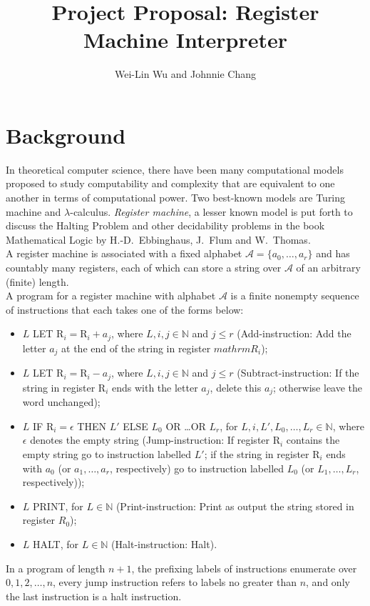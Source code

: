 \documentclass[english]{article}
\begin{document}
\title{Project Proposal: Register Machine Interpreter}

\author{Wei-Lin Wu and Johnnie Chang}

\maketitle
\thispagestyle{fancy}


\section{Background}
In theoretical computer science, there have been many computational models proposed 
to study computability and complexity that are equivalent to one another in terms of computational power. 
Two best-known models are Turing machine and $\lambda$-calculus. 
\emph{Register machine}, a lesser known model is put forth to discuss the Halting Problem 
and other decidability problems in the book Mathematical Logic by H.-D.\ Ebbinghaus, J.\ Flum and W.\ Thomas.
\medskip\\
A register machine is associated with a fixed alphabet $\mathcal{A} = \{a_0, \ldots, a_r\}$ and has countably many registers, 
each of which can store a string over $\mathcal{A}$ of an arbitrary (finite) length.
\medskip\\
A program for a register machine with alphabet $\mathcal{A}$ is a finite nonempty sequence of instructions that each takes one of the forms below:
\begin{itemize}
\item $L$ LET $\mathrm{R}_i = \mathrm{R}_i + a_j$, where $L, i, j \in \mathbb{N}$ and $j \leq r$ (Add-instruction: Add the letter $a_j$ at the end of the string in register $mathrm{R}_i$);
\item $L$ LET $\mathrm{R}_i = \mathrm{R}_i - a_j$, where $L, i, j \in \mathbb{N}$ and $j \leq r$ (Subtract-instruction: If the string in register $\mathrm{R}_i$ ends with the letter $a_j$, delete this $a_j$; otherwise leave the word unchanged);
\item $L$ IF $\mathrm{R}_i = \epsilon$ THEN $L'$ ELSE $L_0$ OR \ldots OR $L_r$, for $L, i, L', L_0, \ldots , L_r \in \mathbb{N}$, where $\epsilon$ denotes the empty string (Jump-instruction: If register $\mathrm{R}_i$ contains the empty string go to instruction labelled $L'$; if the string in register $\mathrm{R}_i$ ends with $a_0$ (or $a_1, \ldots, a_r$, respectively) go to instruction labelled $L_0$ (or $L_1, \ldots, L_r$, respectively));
\item $L$ PRINT, for $L \in \mathbb{N}$ (Print-instruction: Print as output the string stored in register
$R_0$);
\item $L$ HALT, for $L \in \mathbb{N}$ (Halt-instruction: Halt).
\end{itemize}
In a program of length $n + 1$, the prefixing labels of instructions enumerate over $0, 1, 2, \ldots, n$, 
every jump instruction refers to labels no greater than $n$, and only the last instruction is a halt instruction.
\end{document}
